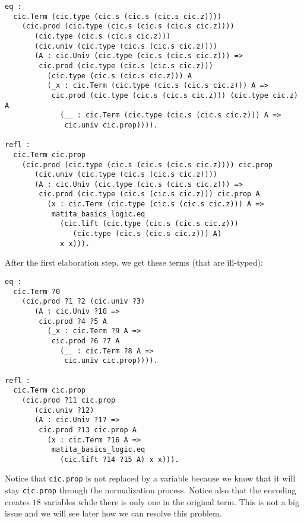 \documentclass{article}
\begin{document}
\begin{verbatim}
eq :
  cic.Term (cic.type (cic.s (cic.s (cic.s cic.z))))
    (cic.prod (cic.type (cic.s (cic.s (cic.s cic.z))))
       (cic.type (cic.s (cic.s cic.z)))
       (cic.univ (cic.type (cic.s (cic.s cic.z))))
       (A : cic.Univ (cic.type (cic.s (cic.s cic.z))) =>
        cic.prod (cic.type (cic.s (cic.s cic.z)))
          (cic.type (cic.s (cic.s cic.z))) A
          (_x : cic.Term (cic.type (cic.s (cic.s cic.z))) A =>
           cic.prod (cic.type (cic.s (cic.s cic.z))) (cic.type cic.z) A
             (__ : cic.Term (cic.type (cic.s (cic.s cic.z))) A =>
              cic.univ cic.prop)))).

refl :
  cic.Term cic.prop
    (cic.prod (cic.type (cic.s (cic.s (cic.s cic.z)))) cic.prop
       (cic.univ (cic.type (cic.s (cic.s cic.z))))
       (A : cic.Univ (cic.type (cic.s (cic.s cic.z))) =>
        cic.prod (cic.type (cic.s (cic.s cic.z))) cic.prop A
          (x : cic.Term (cic.type (cic.s (cic.s cic.z))) A =>
           matita_basics_logic.eq
             (cic.lift (cic.type (cic.s (cic.s cic.z)))
                (cic.type (cic.s (cic.s cic.z))) A)
             x x))).
\end{verbatim}

After the first elaboration step, we get these terms (that are ill-typed):
\begin{verbatim}
eq :
  cic.Term ?0
    (cic.prod ?1 ?2 (cic.univ ?3)
       (A : cic.Univ ?10 =>
        cic.prod ?4 ?5 A
          (_x : cic.Term ?9 A =>
           cic.prod ?6 ?7 A
             (__ : cic.Term ?8 A =>
              cic.univ cic.prop)))).

refl :
  cic.Term cic.prop
    (cic.prod ?11 cic.prop
       (cic.univ ?12)
       (A : cic.Univ ?17 =>
        cic.prod ?13 cic.prop A
          (x : cic.Term ?16 A =>
           matita_basics_logic.eq
             (cic.lift ?14 ?15 A) x x))).
\end{verbatim}

Notice that \texttt{cic.prop} is not replaced by a variable because we know that it will stay \texttt{cic.prop} through the normalization process. Notice also that the encoding creates \(18\) variables while there is only one in the original term. This is not a big issue and we will see later how we can resolve this problem.
\end{document}
